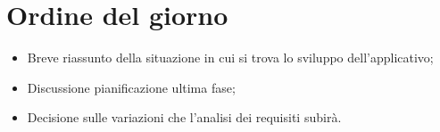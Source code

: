 \documentclass[../RiunioneInterna16-05-17.tex]{subfiles}
\begin{document}
\section{Ordine del giorno}
\begin{itemize}
	\item Breve riassunto della situazione in cui si trova lo sviluppo dell'applicativo;
	\item Discussione pianificazione ultima fase;
	\item Decisione sulle variazioni che l'analisi dei requisiti subirà.
\end{itemize}
\end{document}
